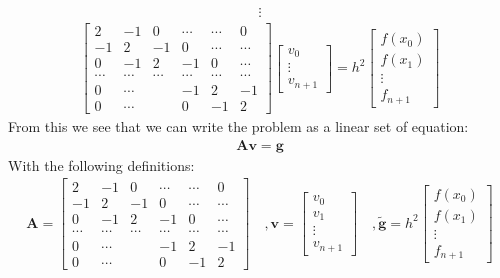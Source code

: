 \documentclass[american,a4paper,12pt]{article}
\renewcommand{\vec}[1]{\mathbf{#1}} %
\begin{document}
  \begin{align*}
    \vdots
  \end{align*}
  \begin{align*}
        \begin{bmatrix}
          2 & -1 & 0 & \cdots & \cdots & 0 \\
          -1 & 2 & -1 & 0 & \cdots & \cdots \\
          0 & -1 & 2 & -1 & 0 & \cdots \\
          \cdots & \cdots & \cdots & \cdots & \cdots & \cdots \\
          0 & \cdots & & -1 & 2 & -1 \\
          0 & \cdots & & 0 & -1 & 2
        \end{bmatrix}
        \begin{bmatrix}
          v_0 \\
          \vdots \\
          v_{n+1}
        \end{bmatrix}
  = h^2
        \begin{bmatrix}
          f(x_0) \\
          f(x_1) \\
          \vdots \\
          f_{n+1}
        \end{bmatrix}
  \end{align*}
  From this we see that we can write the problem as a linear set of equation:
  \begin{align*}
    \vec{A}\vec{v} = \vec{g}
  \end{align*}
  With the following definitions:
  \begin{align*}
    \vec{A} =
    \begin{bmatrix}
      2 & -1 & 0 & \cdots & \cdots & 0 \\
      -1 & 2 & -1 & 0 & \cdots & \cdots \\
      0 & -1 & 2 & -1 & 0 & \cdots \\
      \cdots & \cdots & \cdots & \cdots & \cdots & \cdots \\
      0 & \cdots & & -1 & 2 & -1 \\
      0 & \cdots & & 0 & -1 & 2
    \end{bmatrix}
    \quad, \vec{v} =
    \begin{bmatrix}
      v_0 \\
      v_1 \\
      \vdots \\
      v_{n+1}
    \end{bmatrix}
    \quad, \vec{\tilde{g}} = h^2
    \begin{bmatrix}
      f(x_0) \\
      f(x_1) \\
      \vdots \\
      f_{n+1}
    \end{bmatrix}
  \end{align*}
\end{document}

